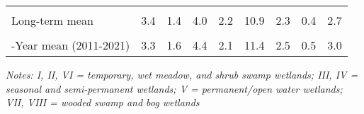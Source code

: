 \documentclass[
  12pt,
]{article}
\begin{document}
\begin{table}[!h]
{\begin{threeparttable}
\begin{tabular}[t]{>{\centering\arraybackslash}m{8em}cccccccc}
\cellcolor{gray!6}{\% Change from previous year} & \cellcolor{gray!6}{-41.9\%} & \cellcolor{gray!6}{-57.1\%} & \cellcolor{gray!6}{5.2\%} & \cellcolor{gray!6}{212.2\%} & \cellcolor{gray!6}{11.3\%} & \cellcolor{gray!6}{15.9\%} & \cellcolor{gray!6}{-17.5\%} & \cellcolor{gray!6}{11.6\%}\\
Long-term mean & 3.4 & 1.4 & 4.0 & 2.2 & 10.9 & 2.3 & 0.4 & 2.7\\
\cellcolor{gray!6}{\% Change from long-term mean} & \cellcolor{gray!6}{-58.9\%} & \cellcolor{gray!6}{-18.4\%} & \cellcolor{gray!6}{43.5\%} & \cellcolor{gray!6}{143.2\%} & \cellcolor{gray!6}{23.8\%} & \cellcolor{gray!6}{40.4\%} & \cellcolor{gray!6}{-23.0\%} & \cellcolor{gray!6}{30.2\%}\\
10-Year mean (2011-2021) & 3.3 & 1.6 & 4.4 & 2.1 & 11.4 & 2.5 & 0.5 & 3.0\\
\bottomrule
\end{tabular}
\begin{tablenotes}
\small
\item \textit{Notes: I, II, VI = temporary, wet meadow, and shrub swamp
    wetlands; III, IV = seasonal and semi-permanent wetlands; V =
    permanent/open water wetlands; VII, VIII = wooded swamp and bog wetlands} 
\item 
\end{tablenotes}
\end{threeparttable}}
\end{table}

\newpage
\end{document}
